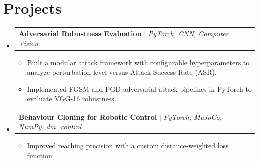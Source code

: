 \documentclass[letterpaper,11pt]{article}
\makeatletter
\newcommand{\resumeItem}[1]{
  \item\small{
    {#1 \vspace{-2pt}}
  }
}
\newcommand{\resumeProjectHeading}[2]{
    \item
    \begin{tabular*}{0.97\textwidth}{l@{\extracolsep{\fill}}r}
      \small#1 & #2 \\
    \end{tabular*}\vspace{-7pt}
}
\newcommand{\resumeSubHeadingListStart}{\begin{itemize}[leftmargin=0.15in, label={}]}
\newcommand{\resumeSubHeadingListEnd}{\end{itemize}}
\newcommand{\resumeItemListStart}{\begin{itemize}[leftmargin=0.2in]}
\newcommand{\resumeItemListEnd}{\end{itemize}\vspace{-5pt}}
\makeatother
\begin{document}
\section{Projects}
\resumeSubHeadingListStart

    \resumeProjectHeading
      {\textbf{Adversarial Robustness Evaluation} $|$ \emph{PyTorch, CNN, Computer Vision}}{}
      \resumeItemListStart
        \resumeItem{Built a modular attack framework with configurable hyperparameters to analyze perturbation level versus Attack Success Rate (ASR).}
        \resumeItem{Implemented FGSM and PGD adversarial attack pipelines in PyTorch to evaluate VGG-16 robustness.}
      \resumeItemListEnd

    \resumeProjectHeading
      {\textbf{Behaviour Cloning for Robotic Control} $|$ \emph{PyTorch, MuJoCo, NumPy, dm\_control}}{}
      \resumeItemListStart
        \resumeItem{Improved reaching precision with a custom distance-weighted loss function.}
      \resumeItemListEnd

\resumeSubHeadingListEnd
\end{document}

